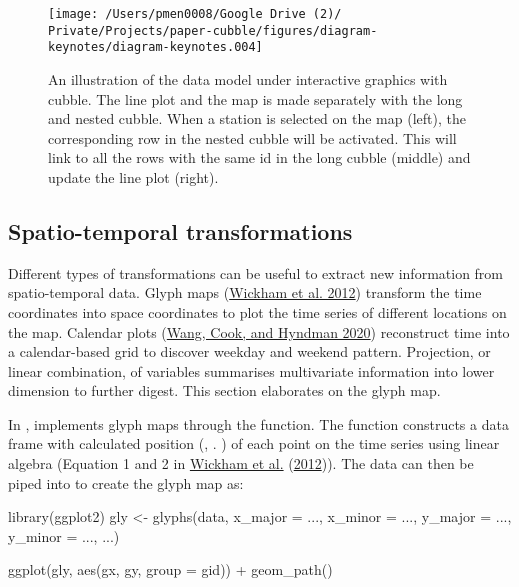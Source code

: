 \documentclass{article}
\newenvironment{Shaded}{\begin{snugshade}}{\end{snugshade}}
\newcommand{\AttributeTok}[1]{\textcolor[rgb]{0.77,0.63,0.00}{#1}}
\newcommand{\FunctionTok}[1]{\textcolor[rgb]{0.00,0.00,0.00}{#1}}
\newcommand{\NormalTok}[1]{#1}
\newcommand{\OtherTok}[1]{\textcolor[rgb]{0.56,0.35,0.01}{#1}}
\newcommand{\SpecialCharTok}[1]{\textcolor[rgb]{0.00,0.00,0.00}{#1}}
\begin{document}
\begin{figure}

{\centering \texttt{[image: /Users/pmen0008/Google Drive (2)/ Private/Projects/paper-cubble/figures/diagram-keynotes/diagram-keynotes.004]} 

}

\caption{An illustration of the data model under interactive graphics with cubble. The line plot and the map is made separately with the long and nested cubble. When a station is selected on the map (left), the corresponding row in the nested cubble will be activated. This will link to all the rows with the same id in the long cubble (middle) and update the line plot (right).}\label{fig:illu-interactive}
\end{figure}

\hypertarget{st_transformation}{%
\subsection{Spatio-temporal transformations}\label{st_transformation}}

Different types of transformations can be useful to extract new information from spatio-temporal data. Glyph maps (\protect\hyperlink{ref-Wickham2012-yr}{Wickham et al. 2012}) transform the time coordinates into space coordinates to plot the time series of different locations on the map. Calendar plots (\protect\hyperlink{ref-wang2020calendar}{Wang, Cook, and Hyndman 2020}) reconstruct time into a calendar-based grid to discover weekday and weekend pattern. Projection, or linear combination, of variables summarises multivariate information into lower dimension to further digest. This section elaborates on the glyph map.

In ,  implements glyph maps through the  function. The function constructs a data frame with calculated position (, . ) of each point on the time series using linear algebra (Equation 1 and 2 in \protect\hyperlink{ref-Wickham2012-yr}{Wickham et al.} (\protect\hyperlink{ref-Wickham2012-yr}{2012})). The data can then be piped into  to create the glyph map as:

\begin{Shaded}
\begin{Highlighting}[]
\FunctionTok{library}\NormalTok{(ggplot2)}
\NormalTok{gly }\OtherTok{\textless{}{-}} \FunctionTok{glyphs}\NormalTok{(data,}
              \AttributeTok{x\_major =}\NormalTok{ ..., }\AttributeTok{x\_minor =}\NormalTok{ ...,}
              \AttributeTok{y\_major =}\NormalTok{ ..., }\AttributeTok{y\_minor =}\NormalTok{ ..., ...)}

\FunctionTok{ggplot}\NormalTok{(gly, }\FunctionTok{aes}\NormalTok{(gx, gy, }\AttributeTok{group =}\NormalTok{ gid)) }\SpecialCharTok{+}
  \FunctionTok{geom\_path}\NormalTok{()}
\end{Highlighting}
\end{Shaded}
\end{document}
